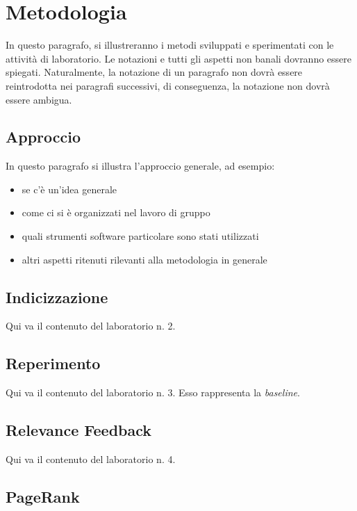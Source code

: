 \documentclass{llncs}
\begin{document}
\section{Metodologia}
\label{sec:metodologia}

In questo paragrafo, si illustreranno i metodi sviluppati e sperimentati con le
attivit\`a di laboratorio. Le notazioni e tutti gli aspetti non banali dovranno
essere spiegati. Naturalmente, la notazione di un paragrafo non dovr\`a essere
reintrodotta nei paragrafi successivi, di conseguenza, la notazione non dovr\`a
essere ambigua.

\subsection{Approccio}
\label{sec:approccio}

In questo paragrafo si illustra l'approccio generale, ad esempio:
\begin{itemize}
\item se c'\`e un'idea generale
\item come ci si \`e organizzati nel lavoro di gruppo
\item quali strumenti software particolare sono stati utilizzati
\item altri
  aspetti ritenuti rilevanti alla metodologia in generale 
\end{itemize}

\subsection{Indicizzazione} \label{sec:metodi-di-indic}

Qui va il contenuto del laboratorio n. 2.

\subsection{Reperimento}
\label{sec:metodi-di-reper}

Qui va il contenuto del laboratorio n. 3. Esso rappresenta la \textit{baseline}.

\subsection{Relevance Feedback}
\label{sec:relevance-feedback}

Qui va il contenuto del laboratorio n. 4.

\subsection{PageRank}
\label{sec:pagerank}
\end{document}

